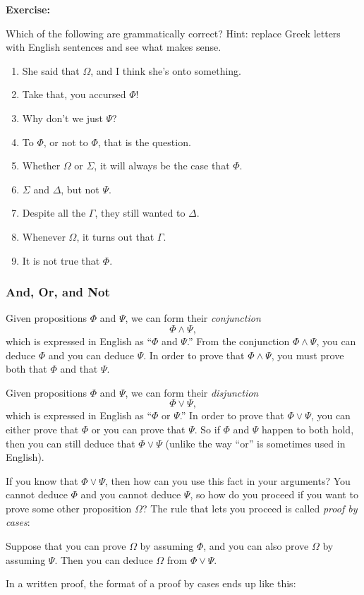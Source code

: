 \documentclass[12pt]{article}
\newcommand{\AND}{\wedge}
\newcommand{\OR}{\vee}
\newcommand{\ex}[1]{\textbf{Exercise:}\begin{adjustwidth}{2em}{}#1\end{adjustwidth}}
\newcommand{\RULE}[2]{\begin{tcolorbox}[title=#1,colbacktitle=white,coltitle=black,colback=white]#2\end{tcolorbox}}
\def\pA{\Phi}
\def\pB{\Psi}
\def\pC{\Omega}
\def\pD{\Sigma}
\def\pE{\Gamma}
\def\pF{\Delta}
\begin{document}
\ex{
Which of the following are grammatically correct? Hint: replace Greek letters with English sentences and see what makes sense.
\begin{enumerate}
\item She said that $\pC$, and I think she's onto something.
\item Take that, you accursed $\pA$!
\item Why don't we just $\pB$?
\item To $\pA$, or not to $\pA$, that is the question.
\item Whether $\pC$ or $\pD$, it will always be the case that $\pA$.
\item $\pD$ and $\pF$, but not $\pB$.
\item Despite all the $\pE$, they still wanted to $\pF$.
\item Whenever $\pC$, it turns out that $\pE$.
\item It is not true that $\pA$.
\end{enumerate}
}



\subsubsection{And, Or, and Not}

Given propositions $\pA$ and $\pB$, we can form their \emph{conjunction}
$$
\pA \AND \pB,
$$
which is expressed in English as ``$\pA$ and $\pB$.''
From the conjunction $\pA\AND\pB$, you can deduce $\pA$ and you can deduce $\pB$.
In order to prove that $\pA\AND\pB$, you must prove both that $\pA$ and that $\pB$.


Given propositions $\pA$ and $\pB$, we can form their \emph{disjunction}
$$
\pA \OR \pB,
$$
which is expressed in English as ``$\pA$ or $\pB$.''
In order to prove that $\pA\OR\pB$, you can either prove that $\pA$ or you can prove that $\pB$.
So if $\pA$ and $\pB$ happen to both hold, then you can still deduce that $\pA\OR\pB$
(unlike the way ``or'' is sometimes used in English).

If you know that $\pA\OR\pB$, then how can you use this fact in your arguments?
You cannot deduce $\pA$ and you cannot deduce $\pB$, so how do you proceed if you want to prove some other proposition $\pC$?
The rule that lets you proceed is called \emph{proof by cases}:
\RULE{Proof by cases}{
Suppose that you can prove $\pC$ by assuming $\pA$, and you can also prove $\pC$ by assuming $\pB$.
Then you can deduce $\pC$ from $\pA\OR\pB$.
}
In a written proof, the format of a proof by cases ends up like this:
\end{document}
